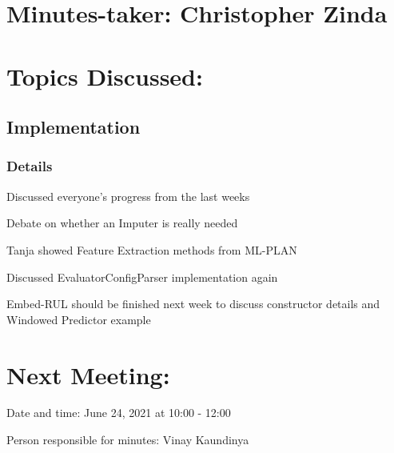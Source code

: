 \documentclass[11pt]{meetingmins} %
\begin{document}
\maketitle

\section{Minutes-taker: Christopher Zinda}

\section{Topics Discussed:}

\subsection{Implementation}
\subsubsection{Details}
\begin{hiddensubitems}
	\item Discussed everyone's progress from the last weeks
	\item Debate on whether an Imputer is really needed
	\item Tanja showed Feature Extraction methods from ML-PLAN
	\item Discussed EvaluatorConfigParser implementation again
	\item Embed-RUL should be finished next week to discuss constructor details and Windowed Predictor example
\end{hiddensubitems}

\section{Next Meeting:}
\begin{hiddensubitems}
	\item Date and time: June 24, 2021 at 10:00 - 12:00
	\item Person responsible for minutes: Vinay Kaundinya
\end{hiddensubitems}
\end{document}
